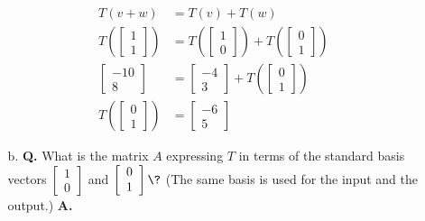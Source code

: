 \documentclass[main.tex]{subfiles}
\begin{document}
\begin{enumerate}
\begin{enumerate}
        $$
        \begin{aligned}
        T(v+w) & = T(v) + T(w)\\
        T\left(\left[\begin{array}{l}1 \\ 1\end{array}\right]\right) 
        & = T\left(\left[\begin{array}{l}1 \\ 0\end{array}\right]\right)+T\left(\left[\begin{array}{l}0 \\ 1\end{array}\right]\right)\\
        \left[\begin{array}{c}
        -10 \\
        8
        \end{array}\right] &= \left[\begin{array}{c}
        -4 \\
        3
        \end{array}\right] + T\left(\left[\begin{array}{l}
        0 \\
        1
        \end{array}\right]\right) \\
        T\left(\left[\begin{array}{l}
        0 \\
        1
        \end{array}\right]\right) &= \left[\begin{array}{c}
        -6 \\
        5
        \end{array}\right]
        \end{aligned}
        $$
        
        \item [b.] \textbf{Q.} What is the matrix $A$ expressing $T$ in terms of the standard basis vectors $\left[\begin{array}{l}1 \\ 0\end{array}\right]$ and $\left[\begin{array}{l}0 \\ 1\end{array}\right] \? $ (The same basis is used for the input and the output.) 
        \textbf{A.}


\end{enumerate}
\end{enumerate}
\end{document}
